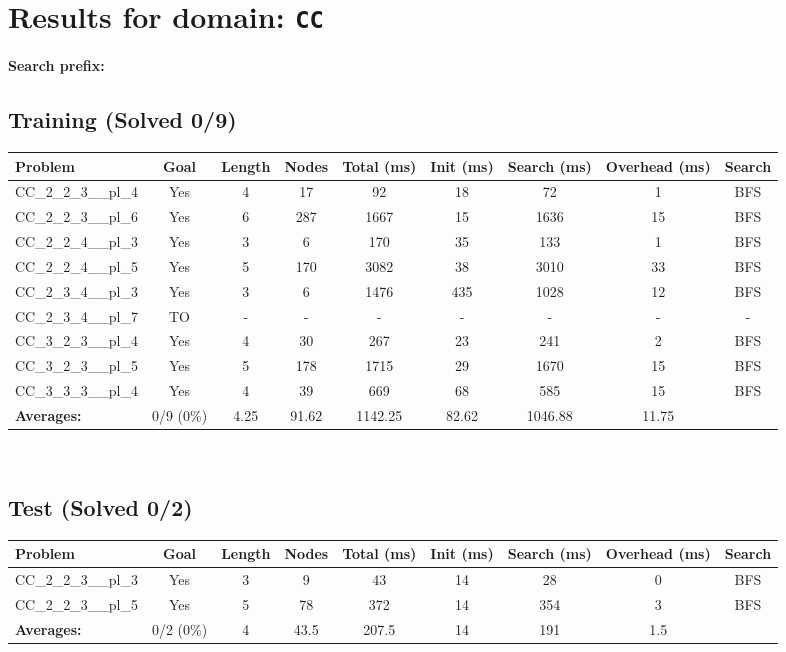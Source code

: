 \documentclass{article}
\begin{document}
\section*{Results for domain: \texttt{CC}}
\textbf{Search prefix:} 
\\[0.5cm]
\subsection*{Training (Solved 0/9)}
\begin{tabular}{lcccccccc}
\toprule
Problem & Goal & Length & Nodes & Total (ms) & Init (ms) & Search (ms) & Overhead (ms) & Search \\
\midrule
CC\_2\_2\_3\_\_pl\_4 & Yes & 4 & 17 & 92 & 18 & 72 & 1 & BFS \\
CC\_2\_2\_3\_\_pl\_6 & Yes & 6 & 287 & 1667 & 15 & 1636 & 15 & BFS \\
CC\_2\_2\_4\_\_pl\_3 & Yes & 3 & 6 & 170 & 35 & 133 & 1 & BFS \\
CC\_2\_2\_4\_\_pl\_5 & Yes & 5 & 170 & 3082 & 38 & 3010 & 33 & BFS \\
CC\_2\_3\_4\_\_pl\_3 & Yes & 3 & 6 & 1476 & 435 & 1028 & 12 & BFS \\
CC\_2\_3\_4\_\_pl\_7 & TO & - & - & - & - & - & - & - \\
CC\_3\_2\_3\_\_pl\_4 & Yes & 4 & 30 & 267 & 23 & 241 & 2 & BFS \\
CC\_3\_2\_3\_\_pl\_5 & Yes & 5 & 178 & 1715 & 29 & 1670 & 15 & BFS \\
CC\_3\_3\_3\_\_pl\_4 & Yes & 4 & 39 & 669 & 68 & 585 & 15 & BFS \\
\textbf{Averages:} & 0/9 (0\%) & 4.25 & 91.62 & 1142.25 & 82.62 & 1046.88 & 11.75 & \\
\bottomrule
\end{tabular}
\\[0.7cm]
\subsection*{Test (Solved 0/2)}
\begin{tabular}{lcccccccc}
\toprule
Problem & Goal & Length & Nodes & Total (ms) & Init (ms) & Search (ms) & Overhead (ms) & Search \\
\midrule
CC\_2\_2\_3\_\_pl\_3 & Yes & 3 & 9 & 43 & 14 & 28 & 0 & BFS \\
CC\_2\_2\_3\_\_pl\_5 & Yes & 5 & 78 & 372 & 14 & 354 & 3 & BFS \\
\textbf{Averages:} & 0/2 (0\%) & 4 & 43.5 & 207.5 & 14 & 191 & 1.5 & \\
\bottomrule
\end{tabular}
\\[0.7cm]
\end{document}
